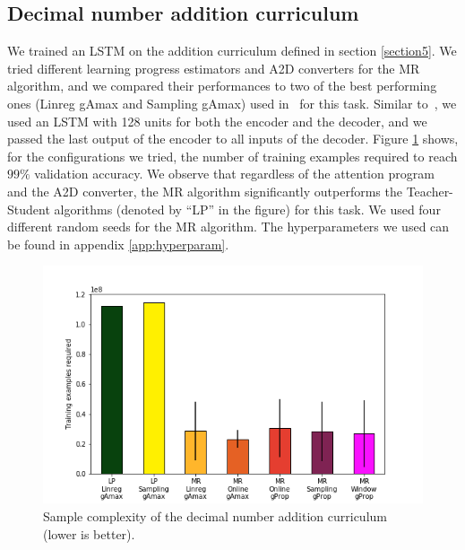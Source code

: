 \documentclass{article}
\begin{document}
\subsection{Decimal number addition curriculum}
\label{section53}
We trained an LSTM on the addition curriculum defined in section \ref{section5}. We tried different learning progress estimators and A2D converters for the MR algorithm, and we compared their performances to two of the best performing ones (Linreg gAmax and Sampling gAmax) used in~\citep{matiisen2017teacher} for this task. Similar to~\citep{matiisen2017teacher}, we used an LSTM with 128 units for both the encoder and the decoder, and we passed the last output of the encoder to all inputs of the decoder. Figure \ref{fig:LSTM} shows, for the configurations we tried, the number of training examples required to reach $99\%$ validation accuracy. We observe that regardless of the attention program and the A2D converter, the MR algorithm significantly outperforms the Teacher-Student algorithms (denoted by ``LP'' in the figure) for this task. We used four different random seeds for the MR algorithm. The hyperparameters we used can be found in appendix \ref{app:hyperparam}.
\begin{figure}
\centering
\includegraphics[width=.5\linewidth]{Stats/LSTM}
\caption{Sample complexity of the decimal number addition curriculum (lower is better). }
\label{fig:LSTM}
\end{figure}
\end{document}
